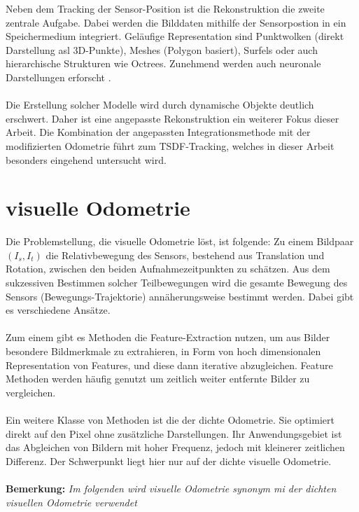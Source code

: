 \documentclass[12pt,DIV=15,BCOR=15mm,twoside,headsepline,abstract=true,listof=totoc,bibliography=totoc]{scrreprt}
\theoremstyle{remark}    %
\begin{document}
    Neben dem Tracking der Sensor-Position ist die Rekonstruktion die zweite zentrale Aufgabe. Dabei werden die Bilddaten mithilfe der 
    Sensorpostion in ein Speichermedium integriert. Geläufige Representation sind Punktwolken (direkt Darstellung asl 3D-Punkte), 
    Meshes (Polygon basiert), Surfels oder auch hierarchische Strukturen wie Octrees. Zunehmend werden auch neuronale Darstellungen erforscht
    \cite{anurev}.\\\\
    Die Erstellung solcher Modelle wird durch dynamische Objekte deutlich erschwert. Daher ist eine angepasste Rekonstruktion ein weiterer Fokus dieser Arbeit.
    Die Kombination der angepassten Integrationsmethode mit der modifizierten Odometrie führt zum \ac{TSDF}-Tracking, welches in dieser Arbeit besonders 
    eingehend untersucht wird.

    \section{visuelle Odometrie}
    Die Problemstellung, die visuelle Odometrie löst, ist folgende: Zu einem Bildpaar $(I_s,I_t)$ die Relativbewegung des Sensors, bestehend aus Translation 
    und Rotation, zwischen den beiden Aufnahmezeitpunkten zu schätzen. 
    Aus dem sukzessiven Bestimmen solcher Teilbewegungen wird die gesamte Bewegung des Sensors (Bewegungs-Trajektorie) annäherungsweise bestimmt werden. 
    Dabei gibt es verschiedene Ansätze.\\\\
    Zum einem gibt es Methoden die Feature-Extraction nutzen, um aus Bilder besondere Bildmerkmale zu extrahieren, in Form von hoch dimensionalen 
    Representation von Features, und diese dann iterative abzugleichen. Feature Methoden werden häufig genutzt um zeitlich weiter
    entfernte Bilder zu vergleichen.\cite{opencv_matcher_tutorial,Mur_Artal_2015}\\\\
    Ein weitere Klasse von Methoden ist die der dichte Odometrie. Sie optimiert direkt auf den Pixel ohne zusätzliche Darstellungen. Ihr Anwendungsgebiet ist 
    das Abgleichen von Bildern mit hoher Frequenz, jedoch mit kleinerer zeitlichen Differenz. Der Schwerpunkt liegt hier nur auf der dichte visuelle Odometrie.\\\\ 
    \textbf{Bemerkung:} \emph{Im folgenden wird visuelle Odometrie synonym mi der dichten visuellen Odometrie verwendet}\\\\
\end{document}
